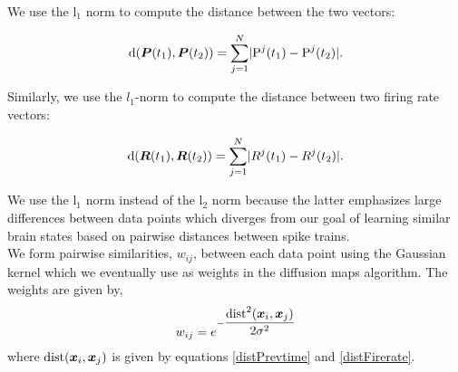 We use the l$_{1}$ norm to compute the distance between the two vectors:

\begin{equation}\label{distPrevtime}
\text{d}(\boldsymbol{P}(t_{1}), \boldsymbol{P}(t_{2}) ) = 
\displaystyle \sum_{j=1}^{N} \lvert \text{P}^{j}(t_{1}) - \text{P}^{j}(t_{2})   \rvert.
\end{equation}

Similarly, we use the $l_{1}$-norm to compute the distance between two firing rate vectors:

\begin{equation}\label{distFirerate}
\text{d}(\boldsymbol{R}(t_{1}), \boldsymbol{R}(t_{2}) ) = 
\displaystyle \sum_{j=1}^{N} \lvert R^{j}(t_{1}) - R^{j}(t_{2})   \rvert.
\end{equation}

We use the  l$_1$ norm  instead of the l$_{2}$ norm because the latter emphasizes large differences between data points which diverges from our goal of learning similar brain states  based on pairwise distances between spike trains.\\


We form pairwise similarities, $w_{ij}$, between each data point using the Gaussian kernel  which we eventually use as weights in the diffusion maps algorithm. The weights are given by,
\[
w_{ij} = e^{-\dfrac{\text{dist}^{2}(\boldsymbol{x}_{i}, \boldsymbol{x}_{j})}{2\sigma^2}} 
\]   where $\text{dist}(\boldsymbol{x}_{i}, \boldsymbol{x}_{j})$ is given by equations
\eqref{distPrevtime} and \eqref{distFirerate}. 



























